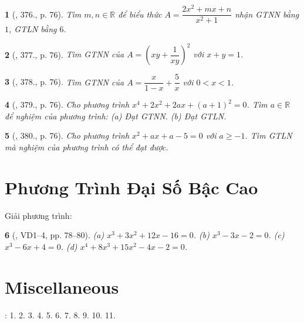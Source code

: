 \documentclass{article}
\newtheorem{baitoan}{}
\begin{document}
\begin{baitoan}[\cite{Binh_Toan_9_tap_2}, 376., p. 76]
	Tìm $m,n\in\mathbb{R}$ để biểu thức $A = \dfrac{2x^2 + mx + n}{x^2 + 1}$ nhận {\rm GTNN} bằng $1$, {\rm GTLN} bằng $6$.
\end{baitoan}

\begin{baitoan}[\cite{Binh_Toan_9_tap_2}, 377., p. 76]
	Tìm {\rm GTNN} của $A = \left(xy + \dfrac{1}{xy}\right)^2$ với $x + y = 1$.
\end{baitoan}

\begin{baitoan}[\cite{Binh_Toan_9_tap_2}, 378., p. 76]
	Tìm {\rm GTNN} của $A = \dfrac{x}{1 - x} + \dfrac{5}{x}$ với $0 < x < 1$.
\end{baitoan}

\begin{baitoan}[\cite{Binh_Toan_9_tap_2}, 379., p. 76]
	Cho phương trình $x^4 + 2x^2 + 2ax + (a + 1)^2 = 0$. Tìm $a\in\mathbb{R}$ để nghiệm của phương trình: (a) Đạt {\rm GTNN}. (b) Đạt {\rm GTLN}.
\end{baitoan}

\begin{baitoan}[\cite{Binh_Toan_9_tap_2}, 380., p. 76]
	Cho phương trình $x^2 + ax + a - 5 = 0$ với $a\ge-1$. Tìm {\rm GTLN} mà nghiệm của phương trình có thể đạt được.
\end{baitoan}


\section{Phương Trình Đại Số Bậc Cao}
Giải phương trình:

\begin{baitoan}[\cite{Binh_Toan_9_tap_2}, VD1--4, pp. 78--80]
	(a) $x^3 + 3x^2 + 12x - 16 = 0$. (b) $x^3 - 3x - 2 = 0$. (c) $x^3 - 6x + 4 = 0$. (d) $x^4 + 8x^3 + 15x^2 - 4x - 2 = 0$.
\end{baitoan}


\section{Miscellaneous}
\cite[BTCCVII, \S3, pp. 66--67]{SGK_Toan_9_Canh_Dieu_tap_2}: 1. 2. 3. 4. 5. 6. 7. 8. 9. 10. 11.


\printbibliography[heading=bibintoc]
	
\end{document}
